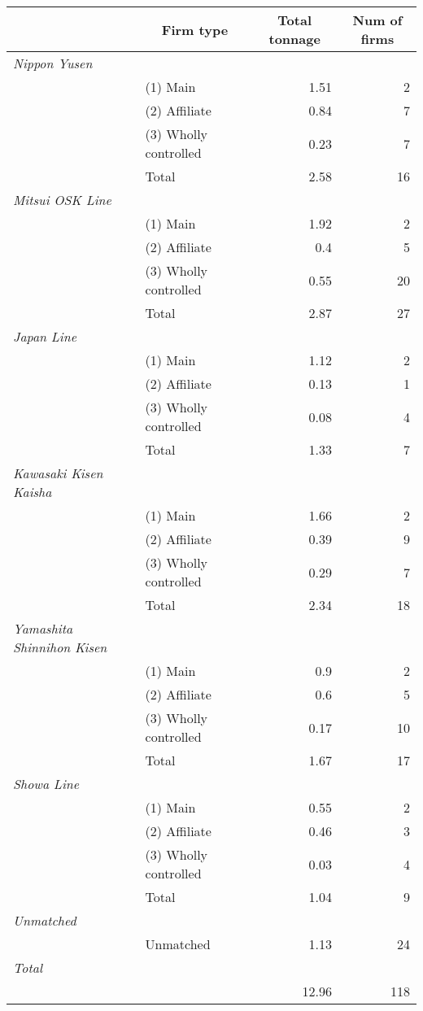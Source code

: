 \begin{tabular}{llrr}
\toprule
\multicolumn{1}{l}{}&\multicolumn{1}{c}{Firm type}&\multicolumn{1}{c}{Total tonnage}&\multicolumn{1}{c}{Num of firms}\tabularnewline
\midrule
{\itshape Nippon Yusen}&&&\tabularnewline
~~&(1) Main&1.51&2\tabularnewline
~~&(2) Affiliate&0.84&7\tabularnewline
~~&(3) Wholly controlled&0.23&7\tabularnewline
~~&Total&2.58&16\tabularnewline
\midrule
{\itshape Mitsui OSK Line}&&&\tabularnewline
~~&(1) Main&1.92&2\tabularnewline
~~&(2) Affiliate&0.4&5\tabularnewline
~~&(3) Wholly controlled&0.55&20\tabularnewline
~~&Total&2.87&27\tabularnewline
\midrule
{\itshape Japan Line}&&&\tabularnewline
~~&(1) Main&1.12&2\tabularnewline
~~&(2) Affiliate&0.13&1\tabularnewline
~~&(3) Wholly controlled&0.08&4\tabularnewline
~~&Total&1.33&7\tabularnewline
\midrule
{\itshape Kawasaki Kisen Kaisha}&&&\tabularnewline
~~&(1) Main&1.66&2\tabularnewline
~~&(2) Affiliate&0.39&9\tabularnewline
~~&(3) Wholly controlled&0.29&7\tabularnewline
~~&Total&2.34&18\tabularnewline
\midrule
{\itshape Yamashita Shinnihon Kisen}&&&\tabularnewline
~~&(1) Main&0.9&2\tabularnewline
~~&(2) Affiliate&0.6&5\tabularnewline
~~&(3) Wholly controlled&0.17&10\tabularnewline
~~&Total&1.67&17\tabularnewline
\midrule
{\itshape Showa Line}&&&\tabularnewline
~~&(1) Main&0.55&2\tabularnewline
~~&(2) Affiliate&0.46&3\tabularnewline
~~&(3) Wholly controlled&0.03&4\tabularnewline
~~&Total&1.04&9\tabularnewline
\midrule
{\itshape Unmatched}&&&\tabularnewline
~~&Unmatched&1.13&24\tabularnewline
\midrule
{\itshape Total}&&&\tabularnewline
~~&&12.96&118\tabularnewline
\bottomrule
\end{tabular}
